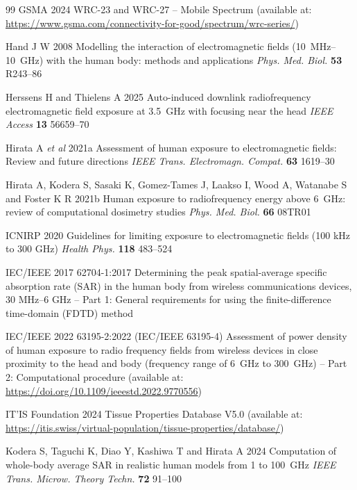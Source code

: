\documentclass{iopjournal}
\begin{document}
\begin{thebibliography}{99}
GSMA 2024 WRC-23 and WRC-27 -- Mobile Spectrum (available at: \url{https://www.gsma.com/connectivity-for-good/spectrum/wrc-series/})

Hand J W 2008 Modelling the interaction of electromagnetic fields (10~MHz--10~GHz) with the human body: methods and applications \emph{Phys. Med. Biol.} \textbf{53} R243--86

Herssens H and Thielens A 2025 Auto-induced downlink radiofrequency electromagnetic field exposure at 3.5~GHz with focusing near the head \emph{IEEE Access} \textbf{13} 56659--70

Hirata A \emph{et al} 2021a Assessment of human exposure to electromagnetic fields: Review and future directions \emph{IEEE Trans. Electromagn. Compat.} \textbf{63} 1619--30

Hirata A, Kodera S, Sasaki K, Gomez-Tames J, Laakso I, Wood A, Watanabe S and Foster K R 2021b Human exposure to radiofrequency energy above 6~GHz: review of computational dosimetry studies \emph{Phys. Med. Biol.} \textbf{66} 08TR01

ICNIRP 2020 Guidelines for limiting exposure to electromagnetic fields (100 kHz to 300 GHz) \emph{Health Phys.} \textbf{118} 483--524

IEC/IEEE 2017 62704-1:2017 Determining the peak spatial-average specific absorption rate (SAR) in the human body from wireless communications devices, 30 MHz--6 GHz -- Part 1: General requirements for using the finite-difference time-domain (FDTD) method

IEC/IEEE 2022 63195-2:2022 (IEC/IEEE 63195-4) Assessment of power density of human exposure to radio frequency fields from wireless devices in close proximity to the head and body (frequency range of 6~GHz to 300~GHz) -- Part 2: Computational procedure (available at: \url{https://doi.org/10.1109/ieeestd.2022.9770556})

IT'IS Foundation 2024 Tissue Properties Database V5.0 (available at: \url{https://itis.swiss/virtual-population/tissue-properties/database/})


Kodera S, Taguchi K, Diao Y, Kashiwa T and Hirata A 2024 Computation of whole-body average SAR in realistic human models from 1 to 100~GHz \emph{IEEE Trans. Microw. Theory Techn.} \textbf{72} 91--100


\end{thebibliography}
\end{document}
